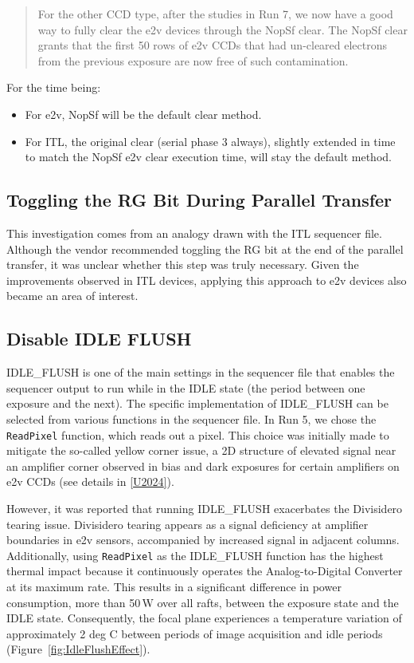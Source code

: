 \begin{quote}
For the other CCD type, after the studies in Run 7, we now have a good way
to fully clear the e2v devices through the NopSf clear. The NopSf clear
grants that the first 50 rows of e2v CCDs that had un-cleared
electrons from the previous exposure are now free of such
contamination.
\end{quote}

For the time being:

\begin{itemize}
\tightlist
\item
  For e2v, NopSf will be the default clear method.
\item
  For ITL, the original clear (serial phase 3 always), slightly extended
  in time to match the NopSf e2v clear execution time, will stay the
  default method.
\end{itemize}

\subsection{Toggling the RG Bit During Parallel Transfer}\label{noRGe2v}
This investigation comes from an analogy drawn with the ITL sequencer file. Although the vendor recommended toggling the RG bit at the end of the parallel transfer, it was unclear whether this step was truly necessary. Given the improvements observed in ITL devices, applying this approach to e2v devices also became an area of interest.

\subsection{Disable IDLE FLUSH}\label{thermal-optimization}

IDLE\_FLUSH is one of the main settings in the sequencer file that enables the sequencer output to run while in the IDLE state (the period between one exposure and the next). The specific implementation of IDLE\_FLUSH can be selected from various functions in the sequencer file. In Run 5, we chose the \texttt{ReadPixel} function, which reads out a pixel. This choice was initially made to mitigate the so-called yellow corner issue, a 2D structure of elevated signal near an amplifier corner observed in bias and dark exposures for certain amplifiers on e2v CCDs (see details in \hyperref[U2024]{{[}U2024{]}}).

However, it was reported that running IDLE\_FLUSH exacerbates the Divisidero tearing issue. Divisidero tearing appears as a signal deficiency at amplifier boundaries in e2v sensors, accompanied by increased signal in adjacent columns. Additionally, using \texttt{ReadPixel} as the IDLE\_FLUSH function has the highest thermal impact because it continuously operates the Analog-to-Digital Converter at its maximum rate. This results in a significant difference in power consumption, more than 50\,W over all rafts, between the exposure state and the IDLE state. Consequently, the focal plane experiences a temperature variation of approximately 2 deg C between periods of image acquisition and idle periods (Figure~\ref{fig:IdleFlushEffect}).

